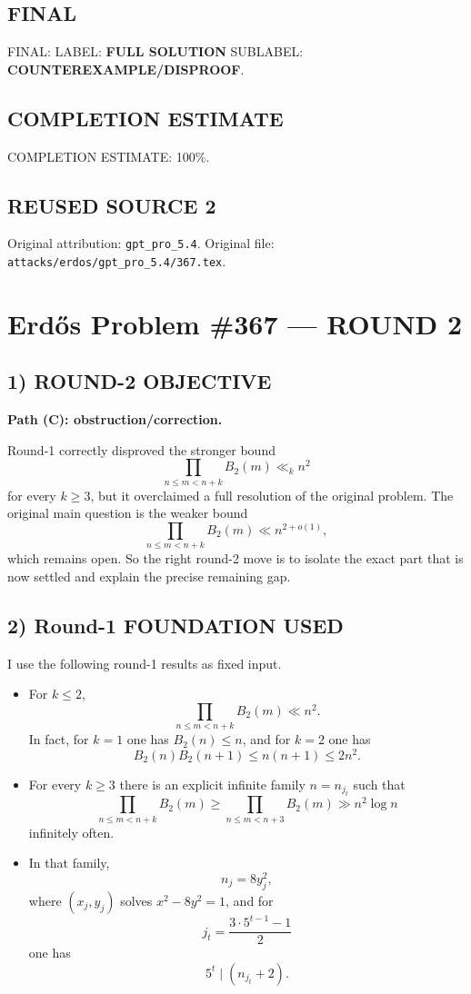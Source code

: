 \subsection*{FINAL}
FINAL: LABEL: \textbf{FULL SOLUTION} \quad SUBLABEL: \textbf{COUNTEREXAMPLE/DISPROOF}.

\subsection*{COMPLETION ESTIMATE}
COMPLETION ESTIMATE: 100\%.



\subsection*{REUSED SOURCE 2}
Original attribution: \texttt{gpt\_pro\_5.4}.
Original file: \texttt{attacks/erdos/gpt\_pro\_5.4/367.tex}.

\section*{Erd\H{o}s Problem \#367 --- ROUND 2}

\subsection*{1) ROUND-2 OBJECTIVE}
\textbf{Path (C): obstruction/correction.}

Round-1 correctly disproved the stronger bound
\[
\prod_{n\le m<n+k} B_2(m) \ll_k n^2
\]
for every $k\ge 3$, but it overclaimed a full resolution of the original problem. The original main question is the weaker bound
\[
\prod_{n\le m<n+k} B_2(m) \ll n^{2+o(1)},
\]
which remains open. So the right round-2 move is to isolate the exact part that is now settled and explain the precise remaining gap.

\subsection*{2) Round-1 FOUNDATION USED}
I use the following round-1 results as fixed input.
\begin{itemize}
\item For $k\le 2$,
\[
\prod_{n\le m<n+k} B_2(m) \ll n^2.
\]
In fact, for $k=1$ one has $B_2(n)\le n$, and for $k=2$ one has
\[
B_2(n)B_2(n+1)\le n(n+1)\le 2n^2.
\]
\item For every $k\ge 3$ there is an explicit infinite family $n=n_{j_t}$ such that
\[
\prod_{n\le m<n+k} B_2(m) \ge \prod_{n\le m<n+3} B_2(m) \gg n^2\log n
\]
infinitely often.
\item In that family,
\[
n_j=8y_j^2,
\]
where $(x_j,y_j)$ solves $x^2-8y^2=1$, and for
\[
j_t=\frac{3\cdot 5^{t-1}-1}{2}
\]
one has
\[
5^t\mid (n_{j_t}+2).
\]
\end{itemize}

